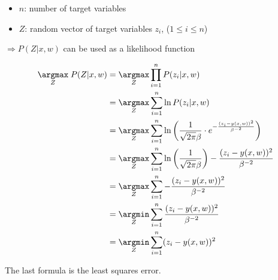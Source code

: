 \begin{itemize}
\item{$n$: number of target variables}
\item{$Z$: random vector of target variables $z_i$, ($1 \leq i \leq n$)}
\end{itemize}

$\Rightarrow P(Z|x,w)$ can be used as a likelihood function

\begin{align*}
 \underset{Z}{\argmax} \; P(Z|x,w) &= \underset{Z}{\argmax} \prod_{i=1}^n P(z_i|x,w) \\
  &= \underset{Z}{\argmax} \sum_{i=1}^n \ln{P(z_i|x,w)} \\
  &= \underset{Z}{\argmax} \sum_{i=1}^n \ln{\left(\frac{1}{\sqrt{2\pi} \beta} \cdot e^{-\frac{(z_i - y(x,w))^2}{\beta^{-2}}}\right)} \\
  &= \underset{Z}{\argmax} \sum_{i=1}^n \ln{\left(\frac{1}{\sqrt{2\pi} \beta}\right)} - \frac{(z_i - y(x,w))^2}{\beta^{-2}} \\
  &= \underset{Z}{\argmax} \sum_{i=1}^n -\frac{(z_i - y(x,w))^2}{\beta^{-2}} \\
  &= \underset{Z}{\argmin} \sum_{i=1}^n \frac{(z_i - y(x,w))^2}{\beta^{-2}} \\
  &= \underset{Z}{\argmin} \sum_{i=1}^n (z_i - y(x,w))^2
\end{align*}

The last formula is the least squares error.
